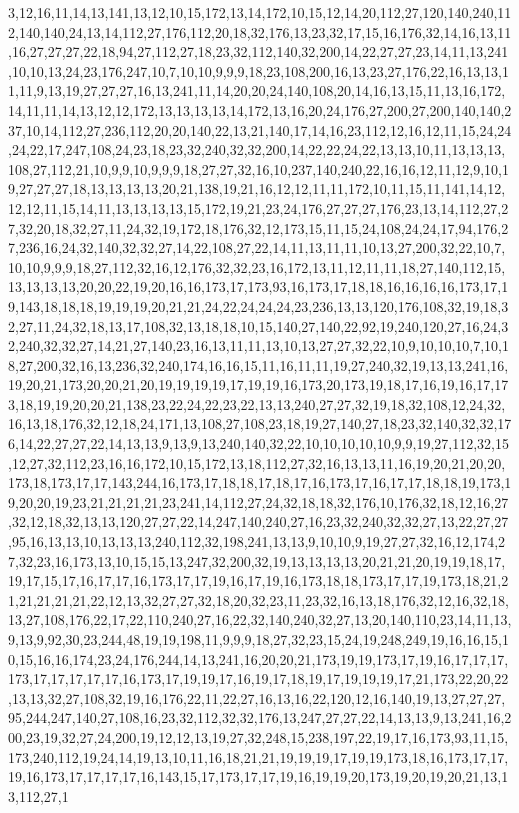 3,12,16,11,14,13,141,13,12,10,15,172,13,14,172,10,15,12,14,20,112,27,120,140,240,112,140,140,24,13,14,112,27,176,112,20,18,32,176,13,23,32,17,15,16,176,32,14,16,13,11,16,27,27,27,22,18,94,27,112,27,18,23,32,112,140,32,200,14,22,27,27,23,14,11,13,241,10,10,13,24,23,176,247,10,7,10,10,9,9,9,18,23,108,200,16,13,23,27,176,22,16,13,13,11,11,9,13,19,27,27,27,16,13,241,11,14,20,20,24,140,108,20,14,16,13,15,11,13,16,172,14,11,11,14,13,12,12,172,13,13,13,13,14,172,13,16,20,24,176,27,200,27,200,140,140,237,10,14,112,27,236,112,20,20,140,22,13,21,140,17,14,16,23,112,12,16,12,11,15,24,24,24,22,17,247,108,24,23,18,23,32,240,32,32,200,14,22,22,24,22,13,13,10,11,13,13,13,108,27,112,21,10,9,9,10,9,9,9,18,27,27,32,16,10,237,140,240,22,16,16,12,11,12,9,10,19,27,27,27,18,13,13,13,13,20,21,138,19,21,16,12,12,11,11,172,10,11,15,11,141,14,12,12,12,11,15,14,11,13,13,13,13,15,172,19,21,23,24,176,27,27,27,176,23,13,14,112,27,27,32,20,18,32,27,11,24,32,19,172,18,176,32,12,173,15,11,15,24,108,24,24,17,94,176,27,236,16,24,32,140,32,32,27,14,22,108,27,22,14,11,13,11,11,10,13,27,200,32,22,10,7,10,10,9,9,9,18,27,112,32,16,12,176,32,32,23,16,172,13,11,12,11,11,18,27,140,112,15,13,13,13,13,20,20,22,19,20,16,16,173,17,173,93,16,173,17,18,18,16,16,16,16,173,17,19,143,18,18,18,19,19,19,20,21,21,24,22,24,24,24,23,236,13,13,120,176,108,32,19,18,32,27,11,24,32,18,13,17,108,32,13,18,18,10,15,140,27,140,22,92,19,240,120,27,16,24,32,240,32,32,27,14,21,27,140,23,16,13,11,11,13,10,13,27,27,32,22,10,9,10,10,10,7,10,18,27,200,32,16,13,236,32,240,174,16,16,15,11,16,11,11,19,27,240,32,19,13,13,241,16,19,20,21,173,20,20,21,20,19,19,19,19,17,19,19,16,173,20,173,19,18,17,16,19,16,17,173,18,19,19,20,20,21,138,23,22,24,22,23,22,13,13,240,27,27,32,19,18,32,108,12,24,32,16,13,18,176,32,12,18,24,171,13,108,27,108,23,18,19,27,140,27,18,23,32,140,32,32,176,14,22,27,27,22,14,13,13,9,13,9,13,240,140,32,22,10,10,10,10,10,9,9,19,27,112,32,15,12,27,32,112,23,16,16,172,10,15,172,13,18,112,27,32,16,13,13,11,16,19,20,21,20,20,173,18,173,17,17,143,244,16,173,17,18,18,17,18,17,16,173,17,16,17,17,18,18,19,173,19,20,20,19,23,21,21,21,21,23,241,14,112,27,24,32,18,18,32,176,10,176,32,18,12,16,27,32,12,18,32,13,13,120,27,27,22,14,247,140,240,27,16,23,32,240,32,32,27,13,22,27,27,95,16,13,13,10,13,13,13,240,112,32,198,241,13,13,9,10,10,9,19,27,27,32,16,12,174,27,32,23,16,173,13,10,15,15,13,247,32,200,32,19,13,13,13,13,20,21,21,20,19,19,18,17,19,17,15,17,16,17,17,16,173,17,17,19,16,17,19,16,173,18,18,173,17,17,19,173,18,21,21,21,21,21,21,22,12,13,32,27,27,32,18,20,32,23,11,23,32,16,13,18,176,32,12,16,32,18,13,27,108,176,22,17,22,110,240,27,16,22,32,140,240,32,27,13,20,140,110,23,14,11,13,9,13,9,92,30,23,244,48,19,19,198,11,9,9,9,18,27,32,23,15,24,19,248,249,19,16,16,15,10,15,16,16,174,23,24,176,244,14,13,241,16,20,20,21,173,19,19,173,17,19,16,17,17,17,173,17,17,17,17,17,16,173,17,19,19,17,16,19,17,18,19,17,19,19,19,17,21,173,22,20,22,13,13,32,27,108,32,19,16,176,22,11,22,27,16,13,16,22,120,12,16,140,19,13,27,27,27,95,244,247,140,27,108,16,23,32,112,32,32,176,13,247,27,27,22,14,13,13,9,13,241,16,200,23,19,32,27,24,200,19,12,12,13,19,27,32,248,15,238,197,22,19,17,16,173,93,11,15,173,240,112,19,24,14,19,13,10,11,16,18,21,21,19,19,19,17,19,19,173,18,16,173,17,17,19,16,173,17,17,17,17,16,143,15,17,173,17,17,19,16,19,19,20,173,19,20,19,20,21,13,13,112,27,1